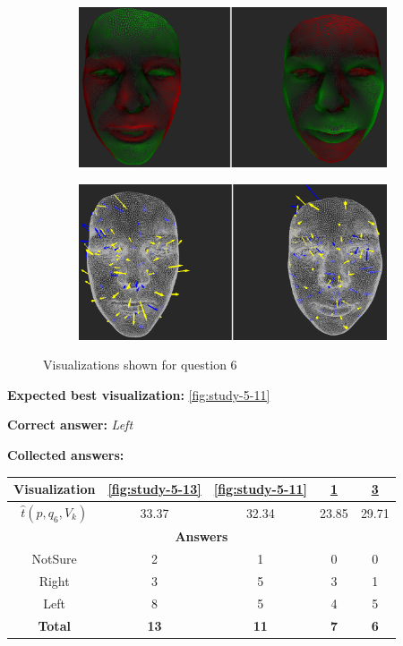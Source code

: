 \begin{figure}[h]
\begin{subfigure}{0.4\textwidth}
\includegraphics[width=\textwidth]{./screenshots/pair12.PNG}
\caption{}
\label{fig:study-5-12}
\end{subfigure}
\quad
\begin{subfigure}{0.4\textwidth}
\includegraphics[width=\textwidth]{./screenshots/pair14.PNG}
\caption{}
\label{fig:study-5-14}
\end{subfigure}
\caption{Visualizations shown for question 6}
\end{figure}
\medskip

{\bf Expected best visualization:} \ref{fig:study-5-11}
\medskip

{\bf Correct answer:} {\it Left}
\medskip

{\bf Collected answers:}

\begin{center}
\begin{tabular}{| c | c | c | c | c |}
	\hline
	Visualization & \ref{fig:study-5-13} & \ref{fig:study-5-11} & \ref{fig:study-5-12} & \ref{fig:study-5-14}\\ \hline
	\(\widehat{t}(p, q_6, V_k)\) & 33.37 & 32.34 & 23.85 & 29.71\\ \hline
	\multicolumn{5}{|c|}{\bf Answers} \\ \hline
	NotSure & 2 & 1 & 0 & 0\\ \hline
	Right & 3 & 5 & 3 & 1\\ \hline
	\rowcolor{yellow!30} Left & 8 & 5 & 4 & 5\\ \hline
	{\bf Total} & {\bf 13} & {\bf 11} & {\bf 7} & {\bf 6}\\ \hline
\end{tabular}
\end{center}
\clearpage


